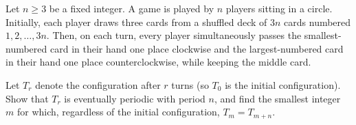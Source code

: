 Let $n \ge 3$ be a fixed integer. A game is played by $n$ players sitting in a circle. Initially, each player draws three cards from a shuffled deck of $3n$ cards numbered $1, 2, \dots, 3n$. Then, on each turn, every player simultaneously passes the smallest-numbered card in their hand one place clockwise and the largest-numbered card in their hand one place counterclockwise, while keeping the middle card.

Let $T_r$ denote the configuration after $r$ turns (so $T_0$ is the initial configuration). Show that $T_r$ is eventually periodic with period $n$, and find the smallest integer $m$ for which, regardless of the initial configuration, $T_m=T_{m+n}$.


